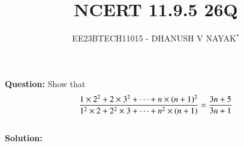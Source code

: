 \documentclass[journal,12pt,twocolumn]{IEEEtran}
\theoremstyle{remark}
\begin{document}

\vspace{3cm}

\title{NCERT 11.9.5 26Q}
\author{EE23BTECH11015 - DHANUSH V NAYAK$^{*}$%
}
\maketitle
\newpage
\bigskip

\renewcommand{\thefigure}{\theenumi}
\renewcommand{\thetable}{\theenumi}


\textbf{Question:} Show that
\begin{equation}
    \frac{1\times2^2 + 2\times3^2 + \dots + n\times(n+1)^2}{1^2\times2 + 2^2\times3 +\dots + n^2\times(n+1)} \notag = \frac{3n+5}{3n+1}
\end{equation}\\
\textbf{Solution:}\\
\end{document}

